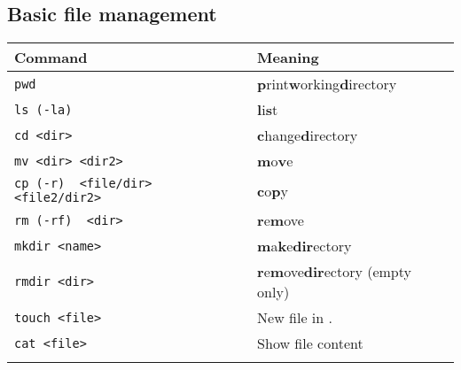 \documentclass{article}
\begin{document}
\subsection{Basic file management}
\begin{minipage}{0.75\textwidth}
    \begin{table}[H]
        \begin{tabular}{ll}
            \textbf{Command}                             & \textbf{Meaning}                               \\ \hline
            \lstinline|pwd|                              & {\bf p}rint{\bf w}orking{\bf d}irectory        \\ \arrayrulecolor{lightgray}\hline
            \lstinline|ls (-la)|                         & {\bf l}i{\bf s}t                               \\ \arrayrulecolor{lightgray}\hline
            \lstinline|cd <dir>|                         & {\bf c}hange{\bf d}irectory                    \\ \arrayrulecolor{lightgray}\hline
            \lstinline|mv <dir> <dir2>|                  & {\bf m}o{\bf v}e                               \\ \arrayrulecolor{lightgray}\hline
            \lstinline|cp (-r)  <file/dir> <file2/dir2>| & {\bf c}o{\bf p}y                               \\ \arrayrulecolor{lightgray}\hline
            \lstinline|rm (-rf)  <dir>|                  & {\bf r}e{\bf m}ove                             \\ \arrayrulecolor{lightgray}\hline
            \lstinline|mkdir <name>|                     & {\bf m}a{\bf k}e{\bf dir}ectory                \\ \arrayrulecolor{lightgray}\hline
            \lstinline|rmdir <dir>|                      & {\bf r}e{\bf m}ove{\bf dir}ectory (empty only) \\ \arrayrulecolor{lightgray}\hline
            \lstinline|touch <file>|                     & New file in .                                  \\ \arrayrulecolor{lightgray}\hline
            \lstinline|cat <file>|                       & Show file content                              \\ \arrayrulecolor{lightgray}\hline
        \end{tabular}
    \end{table}
\end{minipage}
\end{document}
